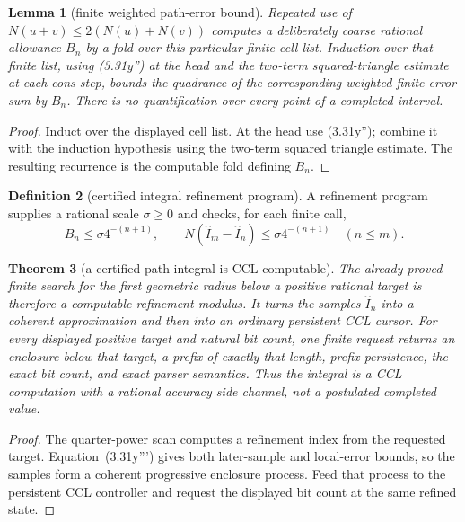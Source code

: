 \documentclass[10pt]{article}
\newtheorem{theorem}{Theorem}[section]
\newtheorem{lemma}[theorem]{Lemma}
\theoremstyle{definition}
\newtheorem{definition}[theorem]{Definition}
\theoremstyle{remark}
\begin{document}
\begin{lemma}[finite weighted path-error bound]
Repeated use of $N(u+v)\leq2(N(u)+N(v))$ computes a deliberately coarse
rational allowance $B_n$ by a fold over this particular finite cell list.
Induction over that finite list, using (3.31y'') at the head and the
two-term squared-triangle estimate at each cons step, bounds the quadrance of
the corresponding weighted finite error sum by $B_n$.  There is no
quantification over every point of a completed interval.
\end{lemma}

\begin{proof}
Induct over the displayed cell list.  At the head use (3.31y''); combine it
with the induction hypothesis using the two-term squared triangle estimate.
The resulting recurrence is the computable fold defining $B_n$.
\end{proof}

\begin{definition}[certified integral refinement program]
A refinement program supplies a rational scale $\sigma\geq0$
and checks, for each finite call,
\[
 B_n\leq \sigma4^{-(n+1)},\qquad
 N(\widehat I_m-\widehat I_n)\leq\sigma4^{-(n+1)}\quad(n\leq m).
 \tag{3.31y'''}
\]
\end{definition}

\begin{theorem}[a certified path integral is CCL-computable]
The already proved finite search for the first geometric radius below a
positive rational target is therefore a computable refinement modulus.
It turns the samples $\widehat I_n$ into a coherent approximation and then
into an ordinary persistent CCL cursor.  For every displayed positive target
and natural bit count, one finite request returns an enclosure below that
target, a prefix of exactly that length, prefix persistence, the exact bit
count, and exact parser semantics.  Thus the integral is a CCL computation
with a rational accuracy side channel, not a postulated completed value.
\end{theorem}

\begin{proof}
The quarter-power scan computes a refinement index from the requested target.
Equation~(3.31y''') gives both later-sample and local-error bounds, so the
samples form a coherent progressive enclosure process.  Feed that process to
the persistent CCL controller and request the displayed bit count at the same
refined state.
\end{proof}
\end{document}
